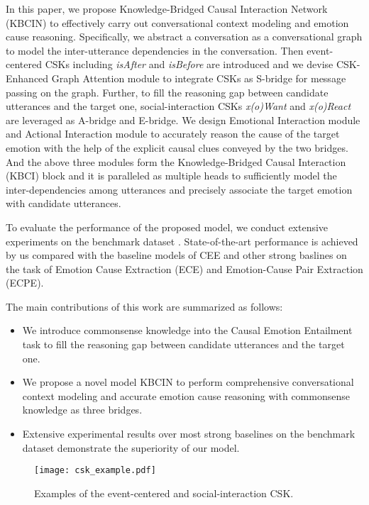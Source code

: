 \documentclass[letterpaper]{article} \usepackage{aaai23}  \usepackage{times}  \usepackage{helvet}  \usepackage{courier}  \usepackage[hyphens]{url}  \usepackage{graphicx} \urlstyle{rm} \def\UrlFont{\rm}  \usepackage{natbib}  \usepackage{caption} \frenchspacing  \setlength{\pdfpagewidth}{8.5in} \setlength{\pdfpageheight}{11in} \usepackage{algorithm}
\begin{document}
In this paper, we propose Knowledge-Bridged Causal Interaction Network (KBCIN) to effectively carry out conversational context modeling and emotion cause reasoning. Specifically, we abstract a conversation as a conversational graph to model the inter-utterance dependencies in the conversation. Then event-centered CSKs including \emph{isAfter} and \emph{isBefore} are introduced and we devise CSK-Enhanced Graph Attention module to integrate CSKs as S-bridge for message passing on the graph. Further, to fill the reasoning gap between candidate utterances and the target one, social-interaction CSKs \emph{x(o)Want} and \emph{x(o)React} are leveraged as A-bridge and E-bridge. We design Emotional Interaction module and Actional Interaction module to accurately reason the cause of the target emotion with the help of the explicit causal clues conveyed by the two bridges. And the above three modules form the Knowledge-Bridged Causal Interaction (KBCI) block and it is paralleled as multiple heads to sufficiently model the inter-dependencies among utterances and precisely associate the target emotion with candidate utterances. 

To evaluate the performance of the proposed model, we conduct extensive experiments on the benchmark dataset \cite{reccon}. State-of-the-art performance is achieved by us compared with the baseline models of CEE and other strong baslines on the task of Emotion Cause Extraction (ECE) and Emotion-Cause Pair Extraction (ECPE).

The main contributions of this work are summarized as follows:
\begin{itemize}
\item We introduce commonsense knowledge into the Causal Emotion Entailment task to fill the reasoning gap between candidate utterances and the target one.
\item We propose a novel model KBCIN to perform comprehensive conversational context modeling and accurate emotion cause reasoning with commonsense knowledge as three bridges.
\item Extensive experimental results over most strong baselines on the benchmark dataset demonstrate the superiority of our model.
\end{itemize}

\begin{figure}[htbp]
\centering
\texttt{[image: csk\_example.pdf]}
\caption{Examples of the event-centered and social-interaction CSK.}
\label{csk_example}
\end{figure}
\end{document}
